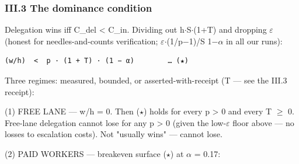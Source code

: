 \documentclass[
]{article}
\begin{document}
\subsubsection{III.3 The dominance
condition}\label{iii3-the-dominance-condition}

Delegation wins iff C\_del \textless{} C\_in. Dividing out h$\cdot$S$\cdot$(1+T) and
dropping $\varepsilon$ (honest for needles-and-counts verification; $\varepsilon$$\cdot$(1/p$-$1)/S \guillemetleft{}
1$-$$\alpha$ in all our runs):

\begin{Verbatim}[breaklines,breakanywhere,fontsize=\small]
  (w/h)  <  p · (1 + T) · (1 − α)        … (★)
\end{Verbatim}

Three regimes: measured, bounded, or asserted-with-receipt (T --- see
the III.3 receipt):

(1) FREE LANE --- w/h = 0. Then ($\star$) holds for every p \textgreater{} 0
and every T $\geq$ 0. Free-lane delegation cannot lose for any p
\textgreater{} 0 (given the low-$\varepsilon$ floor above --- no losses to
escalation costs). Not "usually wins" --- cannot lose.

(2) PAID WORKERS --- breakeven surface ($\star$) at $\alpha$ = 0.17:
\end{document}
